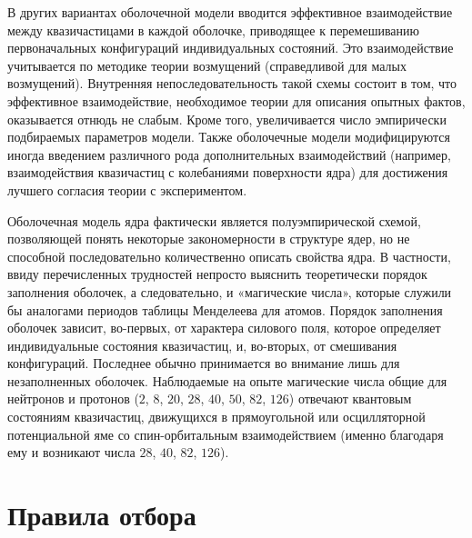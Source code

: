 \documentclass[a4paper,14pt,russian]{article}
\begin{document}
В других вариантах оболочечной модели вводится эффективное взаимодействие между квазичастицами в каждой оболочке, приводящее к перемешиванию первоначальных конфигураций индивидуальных состояний. Это взаимодействие учитывается по методике теории возмущений (справедливой для малых возмущений). Внутренняя непоследовательность такой схемы состоит в том, что эффективное взаимодействие, необходимое теории для описания опытных фактов, оказывается отнюдь не слабым. Кроме того, увеличивается число эмпирически подбираемых параметров модели. Также оболочечные модели модифицируются иногда введением различного рода дополнительных взаимодействий (например, взаимодействия квазичастиц с колебаниями поверхности ядра) для достижения лучшего согласия теории с экспериментом.

Оболочечная модель ядра фактически является полуэмпирической схемой, позволяющей понять некоторые закономерности в структуре ядер, но не способной последовательно количественно описать свойства ядра. В частности, ввиду перечисленных трудностей непросто выяснить теоретически порядок заполнения оболочек, а следовательно, и «магические числа», которые служили бы аналогами периодов таблицы Менделеева для атомов. Порядок заполнения оболочек зависит, во-первых, от характера силового поля, которое определяет индивидуальные состояния квазичастиц, и, во-вторых, от смешивания конфигураций. Последнее обычно принимается во внимание лишь для незаполненных оболочек. Наблюдаемые на опыте магические числа общие для нейтронов и протонов ($2$, $8$, $20$, $28$, $40$, $50$, $82$, $126$) отвечают квантовым состояниям квазичастиц, движущихся в прямоугольной или осцилляторной потенциальной яме со спин-орбитальным взаимодействием (именно благодаря ему и возникают числа $28$, $40$, $82$, $126$).

\newpage

\section{Правила отбора}
\end{document}
